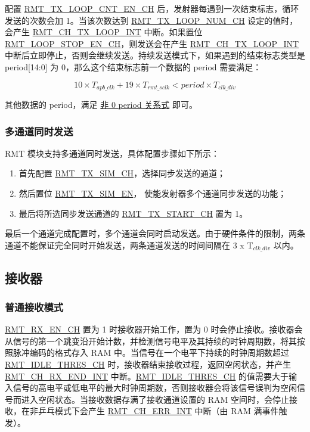 \documentclass[main\_\_CN.tex]{subfiles}
\begin{document}
配置 \hyperref[fielddesc:RMTTXLOOPCNTENCHN]{RMT\_TX\_LOOP\_CNT\_EN\_CH} 后，发射器每遇到一次结束标志，循环发送的次数会加 1。当该次数达到 \hyperref[fielddesc:RMTTXLOOPNUMCHN]{RMT\_TX\_LOOP\_NUM\_CH} 设定的值时，会产生 \hyperref[int:RMTCHnTXLOOPINT]{RMT\_CH\_TX\_LOOP\_INT} 中断。如果置位 \hyperref[fielddesc:RMTLOOPSTOPENCHN]{RMT\_LOOP\_STOP\_EN\_CH}，则发送会在产生 \hyperref[int:RMTCHnTXLOOPINT]{RMT\_CH\_TX\_LOOP\_INT} 中断后立即停止，否则会继续发送。持续发送模式下，如果遇到的结束标志类型是 period[14:0] 为 0，那么这个结束标志前一个数据的 period 需要满足：

\begin{equation}
10 \times T_{apb\_clk} + 19 \times T_{rmt\_sclk} < period \times T_{clk\_div}
\end{equation}

其他数据的 period，满足 \hyperref[eq:rmt-period-value]{非 0 period 关系式} 即可。


\subsubsection{多通道同时发送}

RMT 模块支持多通道同时发送，具体配置步骤如下所示：
\begin{enumerate}
    \item 首先配置 \hyperref[regdesc:RMTTXSIMREG]{RMT\_TX\_SIM\_CH}，选择同步发送的通道；
    \item 然后置位 \hyperref[fielddesc:RMTTXSIMEN]{RMT\_TX\_SIM\_EN}， 使能发射器多个通道同步发送的功能；
    \item 最后将所选同步发送通道的 \hyperref[fielddesc:RMTTXSTARTCHN]{RMT\_TX\_START\_CH} 置为 1。
\end{enumerate}
最后一个通道完成配置时，多个通道会同时启动发送。由于硬件条件的限制，两条通道不能保证完全同时开始发送，两条通道发送的时间间隔在 3 x T$_{clk\_div}$ 以内。


\subsection{接收器}

\subsubsection{普通接收模式}

\hyperref[fielddesc:RMTRXENCHM]{RMT\_RX\_EN\_CH} 置为 1 时接收器开始工作，置为 0 时会停止接收。接收器会从信号的第一个跳变沿开始计数，并检测信号电平及其持续的时钟周期数，将其按照脉冲编码的格式存入 RAM 中。当信号在一个电平下持续的时钟周期数超过 \hyperref[fielddesc:RMTIDLETHRESCHM]{RMT\_IDLE\_THRES\_CH} 时，接收器结束接收过程，返回空闲状态，并产生 \hyperref[int:RMTCHnRXENDINT]{RMT\_CH\_RX\_END\_INT} 中断。\hyperref[fielddesc:RMTIDLETHRESCHM]{RMT\_IDLE\_THRES\_CH} 的值需要大于输入信号的高电平或低电平的最大时钟周期数，否则接收器会将该信号误判为空闲信号而进入空闲状态。当接收数据存满了接收通道设置的 RAM 空间时，会停止接收，在非乒乓模式下会产生 \hyperref[int:RMTCHnERRINT]{RMT\_CH\_ERR\_INT} 中断（由 RAM 满事件触发）。
\end{document}
